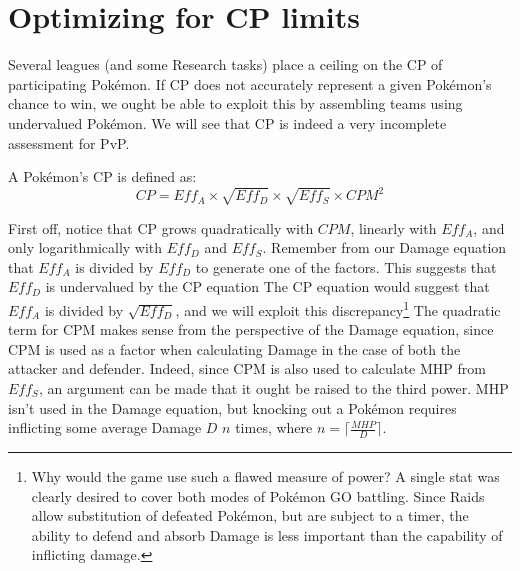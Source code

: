 \chapter{Optimizing for CP limits}

Several leagues (and some Research tasks) place a ceiling on the CP of
 participating Pokémon.
If CP does not accurately represent a given Pokémon's chance to win, we ought
 be able to exploit this by assembling teams using undervalued Pokémon.
We will see that CP is indeed a very incomplete assessment for PvP.

A Pokémon's CP is defined as:
\[ CP = Eff_A \times \sqrt{Eff_D} \times \sqrt{Eff_S} \times CPM^2 \]

First off, notice that CP grows quadratically with $CPM$,
 linearly with $Eff_A$, and only logarithmically with
 $Eff_D$ and $Eff_S$.
Remember from our Damage equation that $Eff_A$ is divided by $Eff_D$
 to generate one of the factors.
This suggests that $Eff_D$ is undervalued by the CP equation
The CP equation would suggest that $Eff_A$ is divided by $\sqrt{Eff_D}$,
 and we will exploit this discrepancy\footnote{Why would the game use such
 a flawed measure of power? A single stat was clearly desired to cover both
 modes of Pokémon GO battling. Since Raids allow substitution of defeated
 Pokémon, but are subject to a timer, the ability to defend and absorb
 Damage is less important than the capability of inflicting damage.}
The quadratic term for CPM makes sense from the perspective of the Damage
 equation, since CPM is used as a factor when calculating Damage in the
 case of both the attacker and defender.
Indeed, since CPM is also used to calculate MHP from $Eff_S$, an argument
 can be made that it ought be raised to the third power.
MHP isn't used in the Damage equation, but knocking out a Pokémon
 requires inflicting some average Damage $D$ $n$ times,
 where $n = \lceil\frac{MHP}{D}\rceil$.
